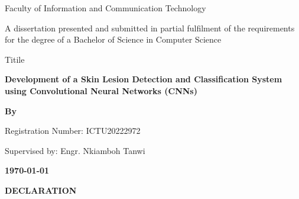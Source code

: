 \documentclass[
  12pt,
  oneside]{article}
\author{}
\date{\vspace{-2.5em}}
\begin{document}
\begin{titlepage}
    \centering
    
    
    \vspace{1cm}
    
    {\Large Faculty of Information and Communication Technology}
    
    \vspace{1.2cm}
    
    {A dissertation presented and submitted in partial fulfilment of the requirements\\
    for the degree of a Bachelor of Science in Computer Science}
    
    \vspace{0.5cm}

    {Titile}
    
    \textbf{Development of a Skin Lesion Detection and Classification System using Convolutional Neural Networks (CNNs)}
    
    \vspace{0.4cm}
    
    \textbf{By}
    
    
    \vspace{0.5cm}
    
    {Registration Number: ICTU20222972}
    
    \vspace{1cm}
    
    {Supervised by: Engr. Nkiamboh Tanwi}
    
    \vspace{2cm}
    
    \textbf{\today}
    
    \vfill
\end{titlepage}
\clearpage
\thispagestyle{empty}
\begin{center}
\textbf{\large DECLARATION}
\end{center}
\end{document}
